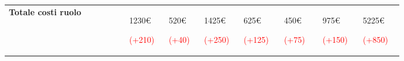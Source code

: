 {\begin{tabular}{P{0.25\linewidth}P{0.07\linewidth}P{0.07\linewidth}P{0.07\linewidth}P{0.08\linewidth}P{0.08\linewidth}P{0.08\linewidth}P{0.08\linewidth}}
            \textbf{Totale costi ruolo} & 
            1230\euro \par \textcolor{red}{(+210)}& 
            520\euro \par \textcolor{red}{(+40)}& 
            1425\euro \par \textcolor{red}{(+250)}& 
            625\euro \par \textcolor{red}{(+125)}& 
            450\euro \par \textcolor{red}{(+75)}& 
            975\euro \par \textcolor{red}{(+150)}& 
            5225\euro \par \textcolor{red}{(+850)}
        \end{tabular}
}

